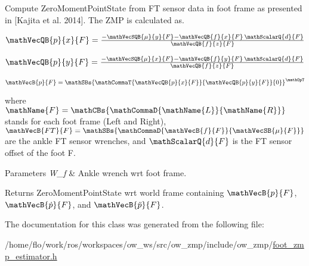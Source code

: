 Compute Zero\+Moment\+Point\+State from FT sensor data in foot frame as presented in \mbox{[}Kajita et al. 2014\mbox{]}. The Z\+MP is calculated as. 

$ \mathVecQB{p}{x}{F}=\frac{-\mathVecSQB{\mu}{y}{F}-\mathVecQB{f}{x}{F}\, \mathScalarQ{d}{F}}{\mathVecQB{f}{z}{F}} $

$ \mathVecQB{p}{y}{F}=\frac{-\mathVecSQB{\mu}{x}{F}-\mathVecQB{f}{y}{F}\, \mathScalarQ{d}{F}}{\mathVecQB{f}{z}{F}} $

$ \mathVecB{p}{F}=\mathSBs{\mathCommaT{\mathVecQB{p}{x}{F}}{\mathVecQB{p} {y}{F}}{0}}^{\mathOpT} $

where $\mathName{F}=\mathCBs{\mathCommaD{\mathName{L}}{\mathName{R}}}$ stands for each foot frame (Left and Right), $ \mathVecB{FT}{F}= \mathSBs{\mathCommaD{\mathVecB{f}{F}}{\mathVecSB{\mu} {F}}}$ are the ankle FT sensor wrenches, and $\mathScalarQ{d}{F}$ is the FT sensor offset of the foot F.


\begin{DoxyParams}{Parameters}
{\em W\+\_\+f} & Ankle wrench wrt foot frame.\\
\hline
\end{DoxyParams}
\begin{DoxyReturn}{Returns}
Zero\+Moment\+Point\+State wrt world frame containing $ \mathVecB{p}{F} $, $ \mathVecB{\dot{p}}{F} $, and $ \mathVecB{\ddot{p}}{F} $. 
\end{DoxyReturn}


The documentation for this class was generated from the following file\+:\begin{DoxyCompactItemize}
\item 
/home/flo/work/ros/workspaces/ow\+\_\+ws/src/ow\+\_\+zmp/include/ow\+\_\+zmp/\hyperlink{foot__zmp__estimator_8h}{foot\+\_\+zmp\+\_\+estimator.\+h}\end{DoxyCompactItemize}
